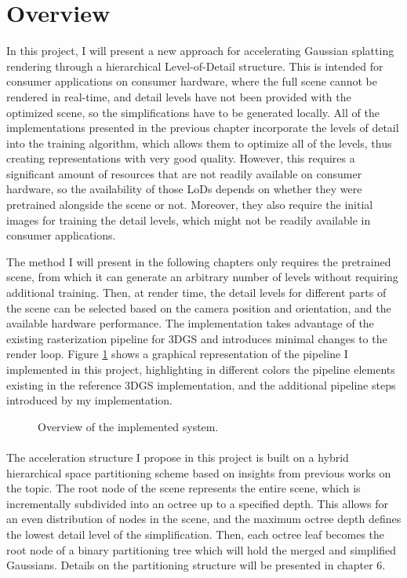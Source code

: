 \section{Overview}

In this project, I will present a new approach for accelerating Gaussian splatting rendering through a hierarchical Level-of-Detail structure. This is intended for consumer applications on consumer hardware, where the full scene cannot be rendered in real-time, and detail levels have not been provided with the optimized scene, so the simplifications have to be generated locally. All of the implementations presented in the previous chapter incorporate the levels of detail into the training algorithm, which allows them to optimize all of the levels, thus creating representations with very good quality. However, this requires a significant amount of resources that are not readily available on consumer hardware, so the availability of those LoDs depends on whether they were pretrained alongside the scene or not. Moreover, they also require the initial images for training the detail levels, which might not be readily available in consumer applications. 

The method I will present in the following chapters only requires the pretrained scene, from which it can generate an arbitrary number of levels without requiring additional training. Then, at render time, the detail levels for different parts of the scene can be selected based on the camera position and orientation, and the available hardware performance. The implementation takes advantage of the existing rasterization pipeline for 3DGS and introduces minimal changes to the render loop. Figure \ref{fig:system} shows a graphical representation of the pipeline I implemented in this project, highlighting in different colors the pipeline elements existing in the reference 3DGS implementation, and the additional pipeline steps introduced by my implementation.

\begin{figure}[H]
    \centering
    
    \caption{Overview of the implemented system.}
    \label{fig:system}
\end{figure}

\paragraph{}
The acceleration structure I propose in this project is built on a hybrid hierarchical space partitioning scheme based on insights from previous works on the topic. The root node of the scene represents the entire scene, which is incrementally subdivided into an octree up to a specified depth. This allows for an even distribution of nodes in the scene, and the maximum octree depth defines the lowest detail level of the simplification. Then, each octree leaf becomes the root node of a binary partitioning tree which will hold the merged and simplified Gaussians. Details on the partitioning structure will be presented in chapter 6.


